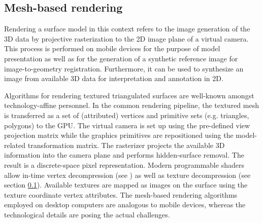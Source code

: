 \documentclass[review]{elsarticle}
\begin{document}

\subsection{Mesh-based rendering}

Rendering a surface model in this context refers to the image generation of the 3D data by projective rasterization to the 2D image plane of a virtual camera. This process is performed on mobile devices for the purpose of model presentation as well as for the generation of a synthetic reference image for image-to-geometry registration. Furthermore, it can be used to synthesize an image from available 3D data for interpretation and annotation in 2D.

Algorithms for rendering textured triangulated surfaces are well-known amongst technology-affine personnel. In the common rendering pipeline, the textured mesh is transferred as a set of (attributed) vertices and primitive sets (e.g. triangles, polygons) to the \gls{GPU}. The virtual camera is set up using the pre-defined view projection matrix while the graphics primitives are repositioned using the model-related transformation matrix. The rasterizer projects the available 3D information into the camera plane and performs hidden-surface removal. The result is a discrete-space pixel representation. Modern programmable shaders allow in-time vertex decompression (see \cite{Ponchio2016}) as well as texture decompression (see section \ref{}). Available textures are mapped as images on the surface using the texture coordinate vertex attributes. The mesh-based rendering algorithms employed on desktop computers are analogous to mobile devices, whereas the technological details are posing the actual challenges.
\end{document}
